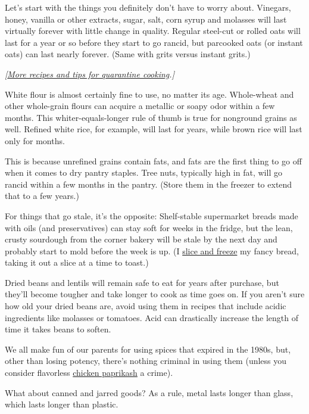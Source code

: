Let's start with the things you definitely don't have to worry about.
Vinegars, honey, vanilla or other extracts, sugar, salt, corn syrup and
molasses will last virtually forever with little change in quality.
Regular steel-cut or rolled oats will last for a year or so before they
start to go rancid, but parcooked oats (or instant oats) can last nearly
forever. (Same with grits versus instant grits.)

\emph{{[}}\href{https://www.nytimes3xbfgragh.onion/article/recipes-cooking-tips-coronavirus.html}{\emph{More
recipes and tips for quarantine cooking}}\emph{.{]}}

White flour is almost certainly fine to use, no matter its age.
Whole-wheat and other whole-grain flours can acquire a metallic or soapy
odor within a few months. This whiter-equals-longer rule of thumb is
true for nonground grains as well. Refined white rice, for example, will
last for years, while brown rice will last only for months.

This is because unrefined grains contain fats, and fats are the first
thing to go off when it comes to dry pantry staples. Tree nuts,
typically high in fat, will go rancid within a few months in the pantry.
(Store them in the freezer to extend that to a few years.)

For things that go stale, it's the opposite: Shelf-stable supermarket
breads made with oils (and preservatives) can stay soft for weeks in the
fridge, but the lean, crusty sourdough from the corner bakery will be
stale by the next day and probably start to mold before the week is up.
(I
\href{https://www.nytimes3xbfgragh.onion/2016/02/24/dining/how-to-make-toast.html}{slice
and freeze} my fancy bread, taking it out a slice at a time to toast.)

Dried beans and lentils will remain safe to eat for years after
purchase, but they'll become tougher and take longer to cook as time
goes on. If you aren't sure how old your dried beans are, avoid using
them in recipes that include acidic ingredients like molasses or
tomatoes. Acid can drastically increase the length of time it takes
beans to soften.

We all make fun of our parents for using spices that expired in the
1980s, but, other than losing potency, there's nothing criminal in using
them (unless you consider flavorless
\href{https://cooking.nytimes3xbfgragh.onion/recipes/1018068-chicken-paprikash}{chicken
paprikash} a crime).

What about canned and jarred goods? As a rule, metal lasts longer than
glass, which lasts longer than plastic.

